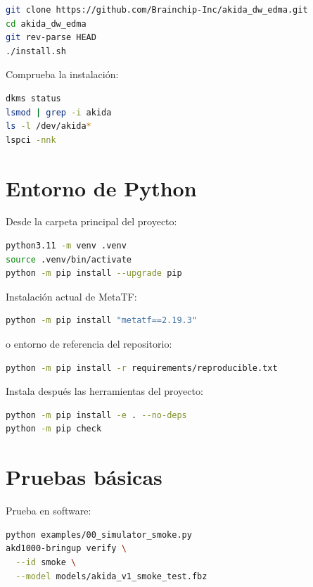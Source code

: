 \begin{lstlisting}[language=bash]
git clone https://github.com/Brainchip-Inc/akida_dw_edma.git
cd akida_dw_edma
git rev-parse HEAD
./install.sh
\end{lstlisting}

Comprueba la instalación:

\begin{lstlisting}[language=bash]
dkms status
lsmod | grep -i akida
ls -l /dev/akida*
lspci -nnk
\end{lstlisting}

\section{Entorno de Python}

Desde la carpeta principal del proyecto:

\begin{lstlisting}[language=bash]
python3.11 -m venv .venv
source .venv/bin/activate
python -m pip install --upgrade pip
\end{lstlisting}

Instalación actual de MetaTF:

\begin{lstlisting}[language=bash]
python -m pip install "metatf==2.19.3"
\end{lstlisting}

o entorno de referencia del repositorio:

\begin{lstlisting}[language=bash]
python -m pip install -r requirements/reproducible.txt
\end{lstlisting}

Instala después las herramientas del proyecto:

\begin{lstlisting}[language=bash]
python -m pip install -e . --no-deps
python -m pip check
\end{lstlisting}

\section{Pruebas básicas}

Prueba en software:

\begin{lstlisting}[language=bash]
python examples/00_simulator_smoke.py
akd1000-bringup verify \
  --id smoke \
  --model models/akida_v1_smoke_test.fbz
\end{lstlisting}

